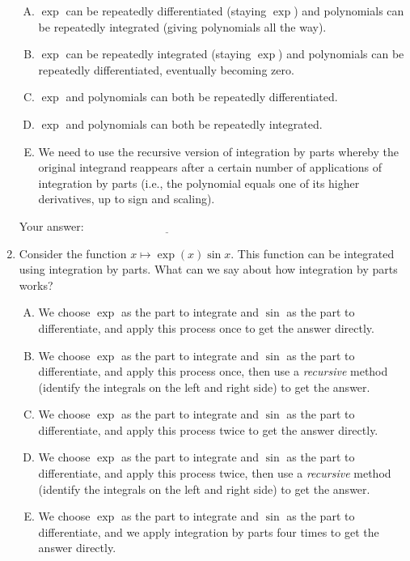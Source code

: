 \documentclass[10pt]{amsart}
\begin{document}
\begin{enumerate}
  \begin{enumerate}[(A)]
  \item $\exp$ can be repeatedly differentiated (staying $\exp$) and
    polynomials can be repeatedly integrated (giving polynomials all
    the way).
  \item $\exp$ can be repeatedly integrated (staying $\exp$) and
    polynomials can be repeatedly differentiated, eventually becoming
    zero.
  \item $\exp$ and polynomials can both be repeatedly differentiated.
  \item $\exp$ and polynomials can both be repeatedly integrated.
  \item We need to use the recursive version of integration by parts
    whereby the original integrand reappears after a certain number of
    applications of integration by parts (i.e., the polynomial equals
    one of its higher derivatives, up to sign and scaling).
  \end{enumerate}

  \vspace{0.05in}
  Your answer: $\underline{\qquad\qquad\qquad\qquad\qquad\qquad\qquad}$
  \vspace{0.05in}

\item Consider the function $x \mapsto \exp(x) \sin
  x$. This function can be integrated using integration by
  parts. What can we say about how integration by parts works?

  \begin{enumerate}[(A)]
  \item We choose $\exp$ as the part to integrate and $\sin$ as the
    part to differentiate, and apply this process once to get the
    answer directly.
  \item We choose $\exp$ as the part to integrate and $\sin$ as the
    part to differentiate, and apply this process once, then use a
    {\em recursive} method (identify the integrals on the left and
    right side) to get the answer.
  \item We choose $\exp$ as the part to integrate and $\sin$ as the
    part to differentiate, and apply this process twice to get the
    answer directly.
  \item We choose $\exp$ as the part to integrate and $\sin$ as the
    part to differentiate, and apply this process twice, then use a
    {\em recursive} method (identify the integrals on the left and
    right side) to get the answer.
  \item We choose $\exp$ as the part to integrate and $\sin$ as the
    part to differentiate, and we apply integration by parts four
    times to get the answer directly.
  \end{enumerate}


\end{enumerate}
\end{document}
